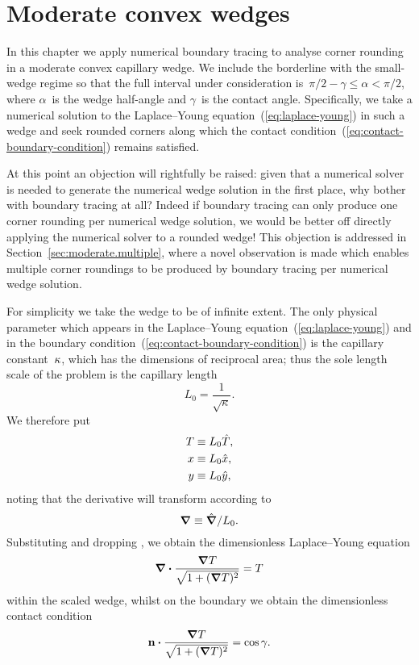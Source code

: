 \chapter{Moderate convex wedges}
\label{ch:moderate}

In this chapter
we apply numerical boundary tracing to analyse corner rounding
in a moderate convex capillary wedge.
We include the borderline with the small-wedge regime
so that the full interval under consideration
is~$\pi/2 - \gamma \le \alpha < \pi/2$,
where $\alpha$~is the wedge half-angle
and $\gamma$~is the contact angle.
Specifically, we take a numerical solution
to the Laplace--Young equation~(\ref{eq:laplace-young}) in such a wedge
and seek rounded corners along which
the contact condition~(\ref{eq:contact-boundary-condition})
remains satisfied.

At this point an objection will rightfully be raised:
given that a numerical solver is needed
to generate the numerical wedge solution in the first place,
why bother with boundary tracing at all?
Indeed if boundary tracing can only produce
one corner rounding per numerical wedge solution,
we would be better off
directly applying the numerical solver to a rounded wedge!
This objection is addressed
in Section~\ref{sec:moderate.multiple},
where a novel observation is made
which enables multiple corner roundings to be produced by boundary tracing
per numerical wedge solution.

\thematicbreak

For simplicity we take the wedge to be of infinite extent.
The only physical parameter which appears
in the Laplace--Young equation~(\ref{eq:laplace-young})
and in the boundary condition~(\ref{eq:contact-boundary-condition})
is the capillary constant~$\kappa$,
which has the dimensions of reciprocal area;
thus the sole length scale of the problem
is the capillary length
\begin{equation}
  L_0 = \frac{1}{\sqrt{\kappa}}.
  \label{eq:capillary-length}
\end{equation}
We therefore put
\begin{align}
  T &\equiv L_0 \hat{T}, \label{eq:capillary-height-scaling} \\
  x &\equiv L_0 \hat{x}, \label{eq:capillary-x-scaling} \\
  y &\equiv L_0 \hat{y}, \label{eq:capillary-y-scaling}
\end{align}
noting that the derivative will transform according to
\begin{equation}
  \mathop{}\!\boldsymbol{\mathbf{\nabla}} \equiv \mathop{}\!\hat{\mathop{}\!\boldsymbol{\mathbf{\nabla}}} / L_0.
  \label{eq:capillary-del-scaling}
\end{equation}
Substituting and dropping \scalingmarks,
we obtain the dimensionless Laplace--Young equation
\begin{equation}
  \mathop{}\!\boldsymbol{\mathbf{\nabla}} \boldsymbol{\cdot} \frac{\mathop{}\!\boldsymbol{\mathbf{\nabla}} T}{\sqrt{1 + (\mathop{}\!\boldsymbol{\mathbf{\nabla}} T)^2}} =  T
  \label{eq:scaled-laplace-young}
\end{equation}
within the scaled wedge,
whilst on the boundary we obtain the dimensionless contact condition
\begin{equation}
  \mathop{}\!\boldsymbol{\mathbf{n}} \boldsymbol{\cdot} \frac{\mathop{}\!\boldsymbol{\mathbf{\nabla}} T}{\sqrt{1 + (\mathop{}\!\boldsymbol{\mathbf{\nabla}} T)^2}} = \cos\gamma.
  \label{eq:scaled-contact-boundary-condition}
\end{equation}

